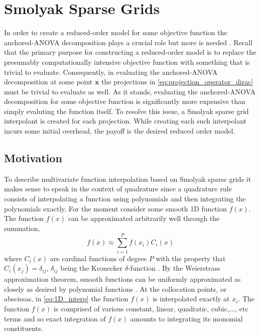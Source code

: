\section{Smolyak Sparse Grids} \label{sec:smolyak_sg}

In order to create a reduced-order model for some objective function the anchored-\ac{ANOVA} decomposition plays a crucial role but more is needed \cite{Hesthaven_ANOVA}. Recall that the primary purpose for constructing a reduced-order model is to replace the presumably computationally intensive objective function with something that is trivial to evaluate. Consequently, in evaluating the anchored-\ac{ANOVA} decomposition at some point $\textbf{x}$ the projections in  \ref{eq:projection_operator_dirac} must be trivial to evaluate as well. As it stands, evaluating the anchored-\ac{ANOVA} decomposition for some objective function is significantly more expensive than simply evaluting the function itself. To resolve this issue, a Smolyak sparse grid interpolant is created for each projection. While creating each such interpolant incurs some initial overhead, the payoff is the desired reduced order model. 

\subsection{Motivation} \label{subsec:motivation}

To describe multivariate function interpolation based on Smolyak sparse grids it makes sense to speak in the context of quadrature since a quadrature rule consists of interpolating a function using polynomials and then integrating the polynomials exactly. For the moment consider some smooth 1D function $f(x)$. The function $f(x)$ can be approximated arbitrarily well through the summation,
\begin{equation} \label{eq:1D_interp}
   f(x) \approx \sum_{i=1}^{P} f(x_i)C_i(x)
\end{equation}
where $C_i(x)$ are cardinal functions of degree $P$ with the property that $C_i(x_j)=\delta_{ij}$, $\delta_{ij}$ being the Kronecker $\delta$-function \cite{Boyd}. By the Weierstrass approximation theorem, smooth functions can be uniformly approximated as closely as desired by polynomial functions \cite{TrefethenApprox}. At the collocation points, or abscissas, in \ref{eq:1D_interp} the function $f(x)$ is interpolated exactly at $x_i$. The function $f(x)$ is comprised of various constant, linear, quadratic, cubic,..., etc terms and so exact integration of $f(x)$ amounts to integrating its monomial constituents.  

